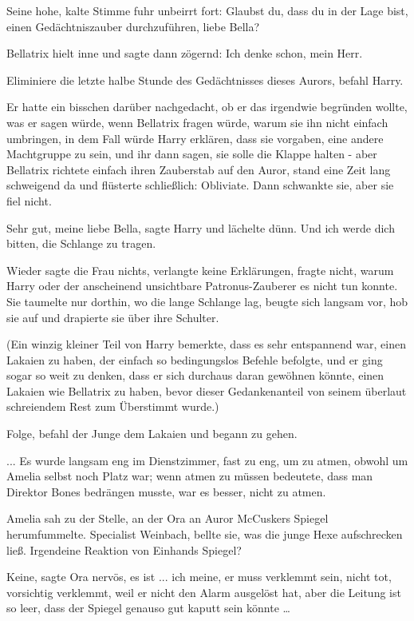 Seine hohe, kalte Stimme fuhr unbeirrt fort: \glqq{}Glaubst du, dass du in der
Lage bist, einen Gedächtniszauber durchzuführen, liebe Bella?\grqq{}

Bellatrix hielt inne und sagte dann zögernd: \glqq{}Ich denke schon, mein Herr.\grqq{}

\glqq{}Eliminiere die letzte halbe Stunde des Gedächtnisses dieses Aurors\grqq{},
befahl Harry.

Er hatte ein bisschen darüber nachgedacht, ob er das irgendwie begründen wollte,
was er sagen würde, wenn Bellatrix fragen würde, warum sie ihn nicht einfach
umbringen, in dem Fall würde Harry erklären, dass sie vorgaben, eine andere
Machtgruppe zu sein, und ihr dann sagen, sie solle die Klappe halten - aber
Bellatrix richtete einfach ihren Zauberstab auf den Auror, stand eine Zeit lang
schweigend da und flüsterte schließlich: \glqq{}Obliviate.\grqq{} Dann schwankte
sie, aber sie fiel nicht.

\glqq{}Sehr gut, meine liebe Bella\grqq{}, sagte Harry und lächelte dünn. \glqq{}
Und ich werde dich bitten, die Schlange zu tragen.\grqq{}

Wieder sagte die Frau nichts, verlangte keine Erklärungen, fragte nicht, warum
Harry oder der anscheinend unsichtbare Patronus-Zauberer es nicht tun konnte.
Sie taumelte nur dorthin, wo die lange Schlange lag, beugte sich langsam vor,
hob sie auf und drapierte sie über ihre Schulter.

(Ein winzig kleiner Teil von Harry bemerkte, dass es sehr entspannend war, einen
Lakaien zu haben, der einfach so bedingungslos Befehle befolgte, und er ging
sogar so weit zu denken, dass er sich durchaus daran gewöhnen könnte, einen
Lakaien wie Bellatrix zu haben, bevor dieser Gedankenanteil von seinem überlaut
schreiendem Rest zum Überstimmt wurde.)

\glqq{}Folge\grqq{}, befahl der Junge dem Lakaien und begann zu gehen.

... Es wurde langsam eng im Dienstzimmer, fast zu eng, um zu atmen, obwohl um
Amelia selbst noch Platz war; wenn atmen zu müssen bedeutete, dass man Direktor
Bones bedrängen musste, war es besser, nicht zu atmen.

Amelia sah zu der Stelle, an der Ora an Auror McCuskers Spiegel herumfummelte.
\glqq{}Specialist Weinbach\grqq{}, bellte sie, was die junge Hexe aufschrecken
ließ. \glqq{}Irgendeine Reaktion von Einhands Spiegel?\grqq{}

\glqq{}Keine\grqq{}, sagte Ora nervös, \glqq{}es ist ... ich meine, er muss
verklemmt sein, nicht tot, vorsichtig verklemmt, weil er nicht den Alarm
ausgelöst hat, aber die Leitung ist so leer, dass der Spiegel genauso gut kaputt
sein könnte …\grqq{}

